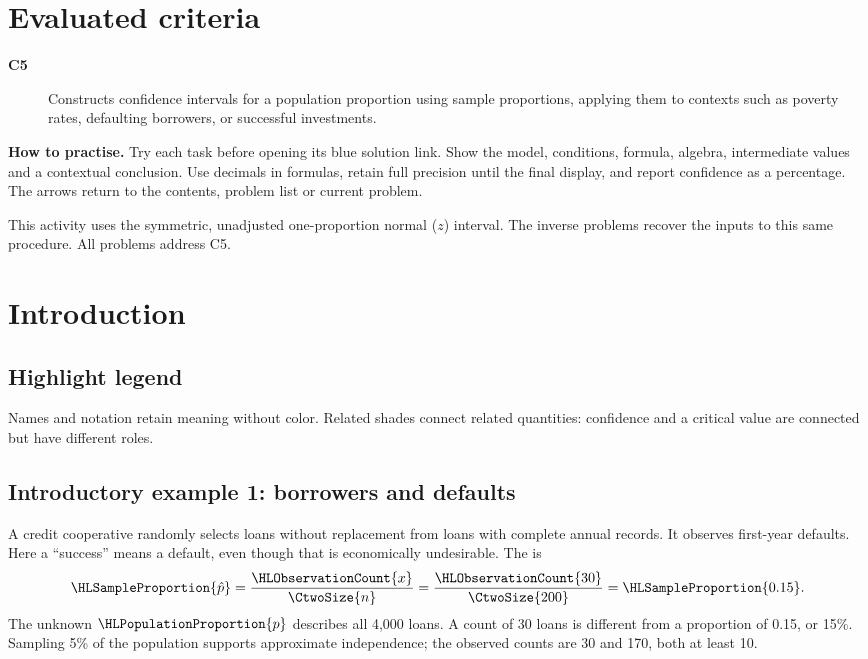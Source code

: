 \section*{Evaluated criteria}

\begin{description}
\item[\textbf{C5}] Constructs confidence intervals for a population proportion using sample proportions, applying them to contexts such as poverty rates, defaulting borrowers, or successful investments.
\end{description}
\textbf{How to practise.} Try each task before opening its blue solution link. Show the model, conditions, formula, algebra, intermediate values and a contextual conclusion. Use decimals in formulas, retain full precision until the final display, and report confidence as a percentage. The arrows return to the contents, problem list or current problem.

This activity uses the symmetric, unadjusted one-proportion normal ($z$) interval. The inverse problems recover the inputs to this same procedure. All problems address C5.
\clearpage

\section{Introduction}\label{sec:introduction}
\subsection*{Highlight legend}
\label{tab:highlight-legend}
Names and notation retain meaning without color. Related shades connect related quantities: confidence and a critical value are connected but have different roles.

\subsection{Introductory example 1: borrowers and defaults}\label{ex:intro-one}
A credit cooperative randomly selects  loans without replacement from  loans with complete annual records. It observes  first-year defaults. Here a ``success'' means a default, even though that is economically undesirable. The  is
\[
\HLSampleProportion{\hat p}=\frac{\HLObservationCount{x}}{\CtwoSize{n}}
=\frac{\HLObservationCount{30}}{\CtwoSize{200}}=\HLSampleProportion{0.15}.
\]
The unknown  $\HLPopulationProportion{p}$ describes all 4,000 loans. A count of 30 loans is different from a proportion of 0.15, or 15\%. Sampling 5\% of the population supports approximate independence; the observed counts are 30 and 170, both at least 10.

